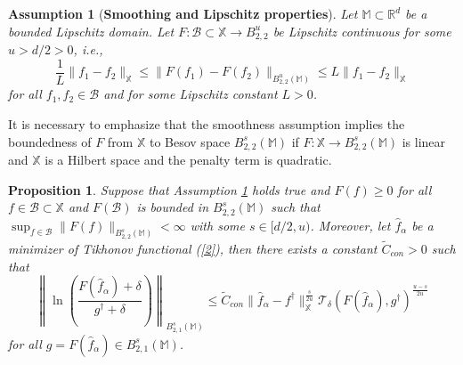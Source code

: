 \documentclass[10pt]{iopart}
\newtheorem{proposition}[theorem]{Proposition}
\newtheorem{assumption}[theorem]{Assumption}
\begin{document}
\begin{assumption}[{\bf Smoothing and Lipschitz properties}]\label{Assumption-4.6}
Let $\mathbb{M}\subset\mathbb{R}^{d}$ be a bounded Lipschitz domain. Let $F: \mathcal{B}\subset\mathbb{X}\rightarrow B_{2, 2}^{u}$ be
Lipschitz continuous for some $u>d/2>0$, i.e., 
\begin{equation*}
\frac{1}{L}\|f_{1}-f_{2}\|_{\mathbb{X}}\leq\|F(f_{1})-F(f_{2})\|_{B_{2, 2}^{u}(\mathbb{M})}\leq L\|f_{1}-f_{2}\|_{\mathbb{X}}
\end{equation*}
for all $f_{1}, f_{2}\in\mathcal{B}$ and for some Lipschitz constant $L>0$. 
\end{assumption}

It is necessary to emphasize that the smoothness assumption implies the boundedness of $F$ from $\mathbb{X}$ to Besov space
$B_{2, 2}^{s}(\mathbb{M})$ if $F:\mathbb{X}\rightarrow B_{2, 2}^{s}(\mathbb{M})$ is linear and $\mathbb{X}$ is a Hilbert space 
and the penalty term is quadratic. 

\begin{proposition}\label{Proposition-4.7}
Suppose that Assumption \ref{Assumption-4.6} holds true and $F(f)\geq 0$ for all $f\in\mathcal{B}\subset\mathbb{X}$ and $F(\mathcal{B})$ is
bounded in $B_{2,2}^{s}(\mathbb{M})$ such that $\sup_{f\in\mathcal{B}}\|F(f)\|_{B_{2,2}^{s}(\mathbb{M})}<\infty$ with some $s\in[d/2, u)$. 
Moreover, let $\widehat{f}_{\alpha}$ be a minimizer of Tikhonov functional (\ref{2}), then there exists a constant $\widetilde{C}_{con}>0$ such that
\begin{equation}\label{40}
\left\|\ln\left(\frac{F(\widehat{f}_{\alpha})+\delta}{g^{\dagger}+\delta}\right)\right\|_{B_{2,1}^{s}(\mathbb{M})} 
\leq \widetilde{C}_{con}\|\widehat{f}_{\alpha}-f^{\dagger}\|_{\mathbb{X}}^{\frac{s}{2u}}\mathcal{T}_{\delta}
(F(\widehat{f}_{\alpha}), g^{\dagger})^{\frac{u-s}{2u}}
\end{equation}
for all $g=F(\widehat{f}_{\alpha})\in B_{2, 1}^{s}(\mathbb{M})$.
\end{proposition}
\end{document}
